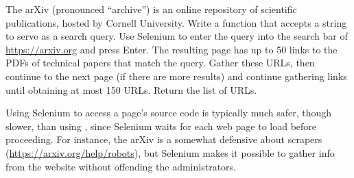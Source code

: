 \begin{problem} %
The arXiv (pronounced ``archive'') is an online repository of scientific publications, hosted by Cornell University.
Write a function that accepts a string to serve as a search query.
Use Selenium to enter the query into the search bar of \url{https://arxiv.org} and press Enter.
The resulting page has up to 50 links to the PDFs of technical papers that match the query.
Gather these URLs, then continue to the next page (if there are more results) and continue gathering links until obtaining at most 150 URLs.
Return the list of URLs.
\end{problem}

\begin{info}
Using Selenium to access a page's source code is typically much safer, though slower, than using , since Selenium waits for each web page to load before proceeding.
For instance, the arXiv is a somewhat defensive about scrapers (\url{https://arxiv.org/help/robots}), but Selenium makes it possible to gather info from the website without offending the administrators.
\end{info}

\begin{comment} %
\begin{problem}
The NBA has live statistics \url{http://stats.nba.com/}.
Use Selenium to return a list of the \li{a} tags containing each of the 30 NBA teams.
Use the \li{find_all()} method in conjunction with whatever unique identifiers get you the correct tags.
\\(Hint: class and tag name are a good start). %

\begin{itemize}
\item The column titles are Name, HW\%, AW\%, where Name is each team name, HW\% is the Home Win \%, and AW\% is the Away Win \%.
\item Each row represents a different basketball team, with its home and away win percentages.
\end{itemize}
Hint: You will need to use Selenium to access each teams website using the links from the tags found in problem \ref{prob:scraping-bball}.
If the websites do not load properly, consider a \li{try-except} clause like the one suggested previously.
\end{problem}
\end{comment}

